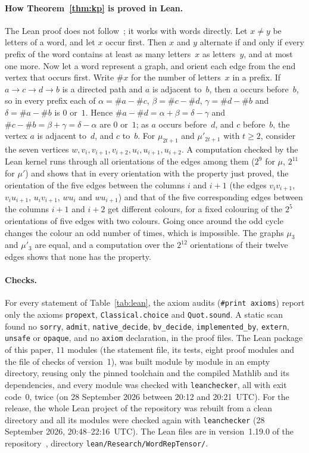 \documentclass[11pt]{article}
\theoremstyle{remark}
\newcommand{\repoversion}{1.19.0}
\begin{document}
\paragraph{How Theorem~\ref{thm:kp} is proved in Lean.}
The Lean proof does not follow~\cite{hameed,kp}; it works with words
directly. Let $x\ne y$ be letters of a word, and let $x$ occur first. Then
$x$ and $y$ alternate if and only if every prefix of the word contains at
least as many letters~$x$ as letters~$y$, and at most one more. Now let a word
represent a graph, and orient each edge from the end vertex that occurs
first. Write $\#x$ for the number of letters~$x$ in a prefix. If
$a\to c\to d\to b$ is a directed path and $a$ is adjacent to~$b$, then $a$
occurs before~$b$, so in every prefix each of $\alpha=\#a-\#c$,
$\beta=\#c-\#d$, $\gamma=\#d-\#b$ and $\delta=\#a-\#b$ is $0$ or~$1$.
Hence $\#a-\#d=\alpha+\beta=\delta-\gamma$ and
$\#c-\#b=\beta+\gamma=\delta-\alpha$ are $0$ or~$1$; as $a$ occurs
before~$d$, and $c$ before~$b$, the vertex $a$ is adjacent to~$d$, and $c$
to~$b$. For $\mu_{2t+1}$ and $\mu'_{2t+1}$ with $t\ge2$, consider the seven
vertices
$w,v_i,v_{i+1},v_{i+2},u_i,u_{i+1},u_{i+2}$. A computation checked by the
Lean kernel runs through all orientations of the edges among them ($2^9$ for
$\mu$, $2^{11}$ for $\mu'$) and shows that in every orientation with the
property just proved, the orientation of the five edges between the columns
$i$ and $i+1$ (the edges $v_iv_{i+1}$, $v_iu_{i+1}$, $u_iv_{i+1}$, $wu_i$
and $wu_{i+1}$) and that of the five corresponding edges between the columns
$i+1$ and $i+2$ get different colours, for a fixed colouring of the $2^5$
orientations of five edges with two colours. Going once around the odd
cycle changes the colour an odd number of times, which is impossible. The graphs $\mu_3$
and $\mu'_3$ are equal, and a computation over the $2^{12}$ orientations of
their twelve edges shows that none has the property.

\paragraph{Checks.}
For every statement of Table~\ref{tab:lean}, the axiom audits
(\texttt{\#print axioms}) report only the axioms \texttt{propext},
\texttt{Classical.choice} and \texttt{Quot.sound}. A static scan found no
\texttt{sorry}, \texttt{admit}, \texttt{native\_decide},
\texttt{bv\_decide}, \texttt{implemented\_by}, \texttt{extern},
\texttt{unsafe} or \texttt{opaque}, and no \texttt{axiom} declaration, in
the proof files. The Lean package of this paper, $11$ modules (the
statement file, its tests, eight proof modules and the file of checks of version~1), was
built module by module in an empty directory,
reusing only the pinned toolchain and the compiled Mathlib and its
dependencies, and every module was checked with \texttt{leanchecker}, all
with exit code~$0$, twice (on 28 September 2026 between 20:12 and 20:21~UTC).
For the release, the whole Lean project of the
repository was rebuilt from a clean directory and all its modules were
checked again with \texttt{leanchecker} (28 September 2026,
20:48--22:16~UTC). The Lean
files are in version~\repoversion{} of the repository~\cite{repo},
directory \texttt{lean/Research/WordRepTensor/}.
\end{document}
